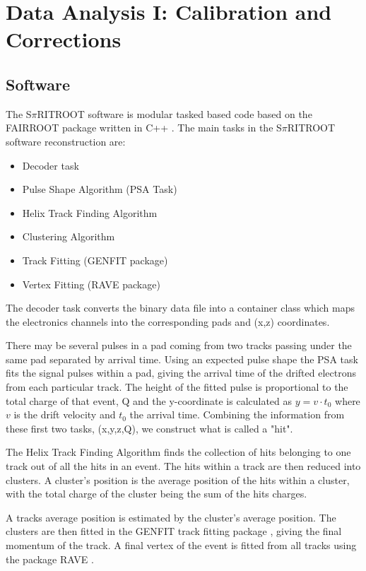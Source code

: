 \chapter{Data Analysis I: Calibration and Corrections}
\section{Software}

The S$\pi$RITROOT software is modular tasked based code based on the FAIRROOT package written in C++ \cite{fairroot}. The main tasks in the S$\pi$RITROOT software reconstruction are:
\begin{itemize}
  \item Decoder task
  \item Pulse Shape Algorithm (PSA Task)
  \item Helix Track Finding Algorithm
  \item Clustering Algorithm
  \item Track Fitting (GENFIT package)
  \item Vertex Fitting (RAVE package)
\end{itemize}

The decoder task converts the binary data file into a container class which maps the electronics channels into the corresponding pads and (x,z) coordinates. 

There may be several pulses in a pad coming from two tracks passing under the same pad separated  by arrival time. Using an expected pulse shape the PSA task fits the signal pulses within a pad, giving the arrival time of the drifted electrons from each particular track. The height of the fitted pulse is proportional to the total charge of that event, Q and the y-coordinate is calculated as $y = v\cdot t_0$ where $v$ is the drift velocity and $t_0$ the arrival time. Combining the information from these first two tasks, (x,y,z,Q), we construct what is called a "hit". 

 The Helix Track Finding Algorithm finds the collection of hits belonging to one track out of all the hits in an event. The hits within a track are then reduced into clusters. A cluster's position is the average position of the hits within a cluster, with the total charge of the cluster being the sum of the hits charges. 
 
 A tracks average position is estimated by the cluster's average position. The clusters are then fitted in the GENFIT track fitting package \cite{genfit}, giving the final momentum of the track. A final vertex of the event is fitted from all tracks using the package RAVE \cite{rave}. 


